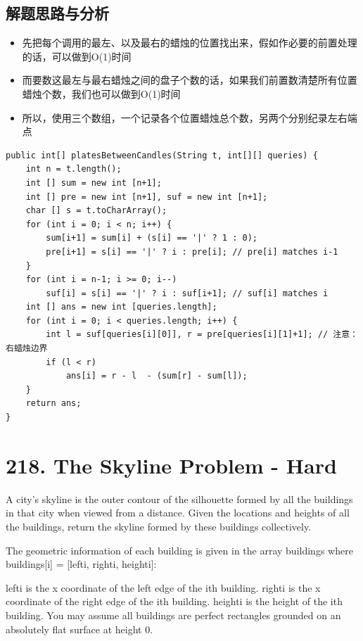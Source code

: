 \documentclass[9pt, b5paaper]{book}
\begin{document}
\subsection{解题思路与分析}
\label{sec-19-2-1}
\begin{itemize}
\item 先把每个调用的最左、以及最右的蜡烛的位置找出来，假如作必要的前置处理的话，可以做到O(1)时间
\item 而要数这最左与最右蜡烛之间的盘子个数的话，如果我们前置数清楚所有位置蜡烛个数，我们也可以做到O(1)时间
\item 所以，使用三个数组，一个记录各个位置蜡烛总个数，另两个分别纪录左右端点
\end{itemize}
\begin{verbatim}
public int[] platesBetweenCandles(String t, int[][] queries) { 
    int n = t.length();
    int [] sum = new int [n+1];
    int [] pre = new int [n+1], suf = new int [n+1];
    char [] s = t.toCharArray();
    for (int i = 0; i < n; i++) {
        sum[i+1] = sum[i] + (s[i] == '|' ? 1 : 0);
        pre[i+1] = s[i] == '|' ? i : pre[i]; // pre[i] matches i-1
    }
    for (int i = n-1; i >= 0; i--)
        suf[i] = s[i] == '|' ? i : suf[i+1]; // suf[i] matches i
    int [] ans = new int [queries.length];
    for (int i = 0; i < queries.length; i++) {
        int l = suf[queries[i][0]], r = pre[queries[i][1]+1]; // 注意： 右蜡烛边界 
        if (l < r)
            ans[i] = r - l  - (sum[r] - sum[l]);
    }
    return ans;
}
\end{verbatim}

\section{218. The Skyline Problem - Hard}
\label{sec-19-3}
A city's skyline is the outer contour of the silhouette formed by all the buildings in that city when viewed from a distance. Given the locations and heights of all the buildings, return the skyline formed by these buildings collectively.

The geometric information of each building is given in the array buildings where buildings[i] = [lefti, righti, heighti]:

lefti is the x coordinate of the left edge of the ith building.
righti is the x coordinate of the right edge of the ith building.
heighti is the height of the ith building.
You may assume all buildings are perfect rectangles grounded on an absolutely flat surface at height 0.
\end{document}
